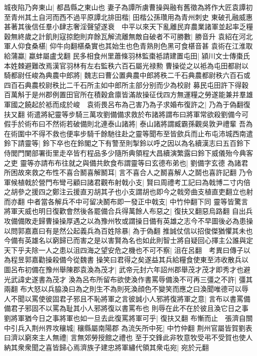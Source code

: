城夜陷乃奔東山|{
	都昌縣之東山也}
妻子為譚所虜曹操與融有舊徵為將作大匠袁譚初至青州其土自河而西不過平原譚北排田楷|{
	田楷公孫瓚用為青州刺史}
東破孔融威惠甚著其後信任羣小肆志奢淫聲望遂衰　中平以來天下亂離民弃農業諸軍並起率乏糧穀無終歲之計飢則寇掠飽則弃餘瓦解流離無敵自破者不可勝數|{
	勝音升}
袁紹在河北軍人仰食桑椹|{
	仰牛向翻椹桑實也其始生也色青熟則色黑可食椹音甚}
袁術在江淮取給蒲蠃|{
	蠃蚌屬盧戈翻}
民多相食州里蕭條羽林監棗袛請建置屯田|{
	潁川文士傳棗氏本姓棘避難改焉漢官羽林有左右監秩六百石屬光禄勲}
曹操從之以袛為屯田都尉以騎都尉任峻為典農中郎將|{
	魏志曰曹公置典農中郎將秩二千石典農都尉秩六百石或四百石典農校尉秩比二千石所主如中郎所主部分别而少為校尉}
募民屯田許下得穀百萬斛于是州郡例置田官所在積穀倉廪皆滿故操征伐四方無運糧之勞遂能兼并羣雄軍國之饒起於袛而成於峻　袁術畏呂布為己害乃為子求婚布復許之|{
	乃為于偽翻復扶又翻}
術遣將紀靈等步騎三萬攻劉備備求救於布諸將謂布曰將軍常欲殺劉備今可假手於術布曰不然術若破備則北連泰山諸將|{
	泰山諸將謂臧霸孫觀吳敦尹禮輩}
吾為在術圍中不得不救也便率步騎千餘馳往赴之靈等聞布至皆歛兵而止布屯沛城西南遣鈴下請靈等|{
	鈴下卒也在鈴閣之下有警至則掣鈴以呼之因以為名續漢志曰五百鈴下侍閭門闌部署街里走卒皆冇程品多少隨所典領程大昌續演繁露曰鈴下威儀殆今典客之吏}
靈等亦請布布往就之與備共飲食布謂靈等曰玄德布弟也|{
	劉備字玄德}
為諸君所困故來救之布性不喜合鬭喜解鬭耳|{
	言不喜合人之鬭喜解人之鬬也喜許記翻}
乃令軍候植戟於營門布彎弓顧曰諸君觀布射戟小支|{
	賢曰周禮考工記曰為戟博二寸内倍之胡參之援四之鄭注云援直刃胡其孑也小支謂胡也即今之戟旁曲支植直吏翻立也射而亦翻}
中者當各解兵不中可留决鬭布即一發正中戟支|{
	中竹仲翻下同}
靈等皆驚言將軍天威也明日復歡會然後各罷備合兵得萬餘人布惡之|{
	復扶又翻惡烏路翻}
自出兵攻備備敗走歸曹操操厚遇之以為豫州牧或謂操日備有英雄之志今不早圖後必為患操以問郭嘉嘉曰有是然公起義兵為百姓除暴|{
	為于偽翻}
推誠仗信以招俊傑猶懼其未也今備有英雄名以窮歸已而害之是以害賢為名也如此則智士將自疑回心擇主公誰與定天下乎夫除一人之患以沮四海之望安危之機也不可不察|{
	沮在呂翻　考異曰傳子以為程昱郭嘉勸操殺備今從魏書}
操笑曰君得之矣遂益其兵給糧食使東至沛收散兵以圖呂布初備在豫州舉陳郡袁渙為茂才|{
	武帝元封六年詔州郡舉茂才茂才即秀才也避光武諱史遂書為茂才}
渙為呂布所留布欲使渙作書罵辱備渙不可再三彊之不許|{
	彊其兩翻}
布大怒以兵脇渙曰為之則生不為則死渙顔色不變笑而應之曰渙聞唯德可以辱人不聞以罵使彼固君子邪且不恥將軍之言彼誠小人邪將復將軍之意|{
	言布以書罵備備君子邪固不以罵為耻其小人邪將復以書罵布也}
則辱在此不在於彼且渙它日之事劉將軍猶今日之事將軍也如一旦去此復罵將軍可乎|{
	復扶又翻}
布慚而止　張濟自關中引兵入荆州界攻穰城|{
	穰縣屬南陽郡}
為流矢所中死|{
	中竹仲翻}
荆州官屬皆賀劉表曰濟以窮來主人無禮|{
	言無郊勞授館之禮也}
至于交鋒此非牧意牧受弔不受賀也使人納其衆衆聞之喜皆歸心焉濟族子建忠將軍繡代領其衆屯宛|{
	宛於元翻}
